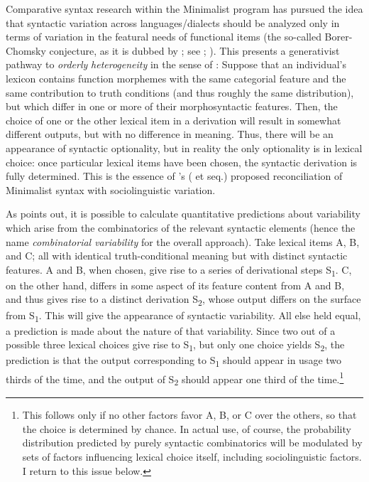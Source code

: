 \documentclass[output=paper]{langsci/langscibook}
\begin{document}
Comparative syntax research within the Minimalist program has pursued the idea
that syntactic variation across languages\slash dialects should be analyzed only in
terms of variation in the featural needs of functional items (the so-called
Borer-Chomsky conjecture, as it is dubbed by \citealt{Baker2008b}; see
\citealt{Borer1984}; \citealt{Chomsky1995}).  This presents a generativist
pathway to \emph{orderly} \emph{heterogeneity} in the sense of
\textcite{WeiLabHer1968}: Suppose that an individual’s lexicon contains
function morphemes with the same categorial feature and the same contribution
to truth conditions (and thus roughly the same distribution), but which differ
in one or more of their morphosyntactic features.  Then, the choice of one or
the other lexical item in a derivation will result in somewhat different
outputs, but with no difference in meaning.  Thus, there will be an appearance
of syntactic optionality, but in reality the only optionality is in lexical
choice: once particular lexical items have been chosen, the syntactic
derivation is fully determined.  This is the essence of
\citeauthor{Adger2006}'s (\citeyear{Adger2006} et seq.) proposed
reconciliation of Minimalist syntax with sociolinguistic
variation.\largerpage[2]

As \citet{Adger2006} points out, it is possible to calculate quantitative
predictions about variability which arise from the combinatorics of the
relevant syntactic elements (hence the name \emph{combinatorial variability} 
for the overall approach).  Take lexical items A, B, and
C; all with identical truth-conditional meaning but with distinct syntactic
features.   A and B, when chosen, give rise to a series of derivational steps
S\textsubscript{1}.  C, on the other hand, differs in some aspect of its
feature content from A and B, and thus gives rise to a distinct derivation
S\textsubscript{2}, whose output differs on the surface from
S\textsubscript{1}.  This will give the appearance of syntactic variability.
All else held equal, a prediction is made about the nature of that variability.
Since two out of a possible three lexical choices give rise to
S\textsubscript{1}, but only one choice yields S\textsubscript{2}, the
prediction is that the output corresponding to S\textsubscript{1} should appear
in usage two thirds of the time, and the output of S\textsubscript{2} should
appear one third of the time.\footnote{This follows only if no other factors
favor A, B, or C over the others, so that the choice is determined by chance.
In actual use, of course, the probability distribution predicted by purely
syntactic combinatorics will be modulated by sets of factors influencing
lexical choice itself, including sociolinguistic factors.  I return to this
issue below.}
\end{document}
